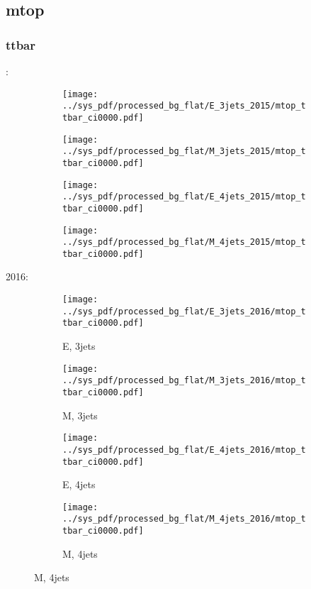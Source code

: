 \documentclass{beamer}
\begin{document}
\subsection{mtop}

\begin{frame}
\frametitle{ttbar}
\fontsize{5}{1}:
\begin{figure}
\centering
\begin{subfigure}[b]{0.24\textwidth}
\texttt{[image: ../sys\_pdf/processed\_bg\_flat/E\_3jets\_2015/mtop\_ttbar\_ci0000.pdf]}
\end{subfigure}
\begin{subfigure}[b]{0.24\textwidth}
\texttt{[image: ../sys\_pdf/processed\_bg\_flat/M\_3jets\_2015/mtop\_ttbar\_ci0000.pdf]}
\end{subfigure}
\begin{subfigure}[b]{0.24\textwidth}
\texttt{[image: ../sys\_pdf/processed\_bg\_flat/E\_4jets\_2015/mtop\_ttbar\_ci0000.pdf]}
\end{subfigure}
\begin{subfigure}[b]{0.24\textwidth}
\texttt{[image: ../sys\_pdf/processed\_bg\_flat/M\_4jets\_2015/mtop\_ttbar\_ci0000.pdf]}
\end{subfigure}
\end{figure}
2016:
\begin{figure}
\centering
\begin{subfigure}[b]{0.24\textwidth}
\texttt{[image: ../sys\_pdf/processed\_bg\_flat/E\_3jets\_2016/mtop\_ttbar\_ci0000.pdf]}
\captionsetup{font=tiny}
\caption{E, 3jets}
\end{subfigure}
\begin{subfigure}[b]{0.24\textwidth}
\texttt{[image: ../sys\_pdf/processed\_bg\_flat/M\_3jets\_2016/mtop\_ttbar\_ci0000.pdf]}
\captionsetup{font=tiny}
\caption{M, 3jets}
\end{subfigure}
\begin{subfigure}[b]{0.24\textwidth}
\texttt{[image: ../sys\_pdf/processed\_bg\_flat/E\_4jets\_2016/mtop\_ttbar\_ci0000.pdf]}
\captionsetup{font=tiny}
\caption{E, 4jets}
\end{subfigure}
\begin{subfigure}[b]{0.24\textwidth}
\texttt{[image: ../sys\_pdf/processed\_bg\_flat/M\_4jets\_2016/mtop\_ttbar\_ci0000.pdf]}
\captionsetup{font=tiny}
\caption{M, 4jets}
\end{subfigure}
\end{figure}
\end{frame}
\end{document}
